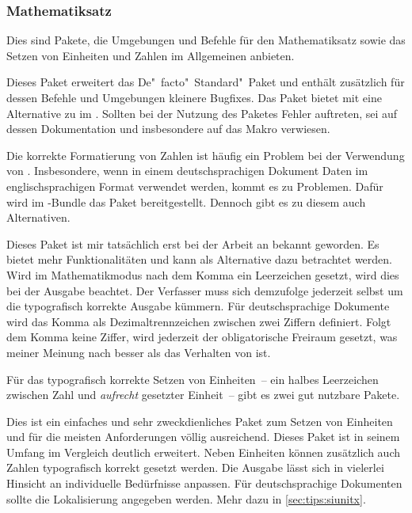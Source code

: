 \subsubsection{%
  Mathematiksatz%
}

Dies sind Pakete, die Umgebungen und Befehle für den Mathematiksatz sowie das 
Setzen von Einheiten und Zahlen im Allgemeinen anbieten.

\begin{DeclarePackages}
  Dieses Paket erweitert das De"~facto"~Standard"~Paket  und 
  enthält zusätzlich für dessen Befehle und Umgebungen kleinere Bugfixes.
  Das Paket bietet mit  eine Alternative zu  im 
  . Sollten bei 
  der Nutzung des Paketes Fehler auftreten, sei auf dessen Dokumentation und 
  insbesondere auf das Makro  verwiesen.
\end{DeclarePackages}

Die korrekte Formatierung von Zahlen ist häufig ein Problem bei der Verwendung 
von . Insbesondere, wenn in einem deutschsprachigen Dokument 
Daten im englischsprachigen Format verwendet werden, kommt es zu Problemen. 
Dafür wird im \TUDScript-Bundle das Paket  bereitgestellt. 
Dennoch gibt es zu diesem auch Alternativen.

\begin{DeclarePackages}[Zifferngruppierung]
  Dieses Paket ist mir tatsächlich erst bei der Arbeit an  
  bekannt geworden. Es bietet mehr Funktionalitäten und kann als Alternative 
  dazu betrachtet werden.
  Wird im Mathematikmodus nach dem Komma ein Leerzeichen gesetzt, wird dies 
  bei der Ausgabe beachtet. Der Verfasser muss sich demzufolge jederzeit 
  selbst um die typografisch korrekte Ausgabe kümmern.
  Für deutschsprachige Dokumente wird das Komma als Dezimaltrennzeichen 
  zwischen zwei Ziffern definiert. Folgt dem Komma keine Ziffer, wird 
  jederzeit der obligatorische Freiraum gesetzt, was meiner Meinung nach 
  besser als das Verhalten von  ist.
\end{DeclarePackages}

Für das typografisch korrekte Setzen von Einheiten~-- ein halbes Leerzeichen 
zwischen Zahl und \emph{aufrecht} gesetzter Einheit~-- gibt es zwei gut 
nutzbare Pakete.

\begin{DeclarePackages}[Einheiten]
  Dies ist ein einfaches und sehr zweckdienliches Paket zum Setzen von 
  Einheiten und für die meisten Anforderungen völlig ausreichend.
  Dieses Paket ist in seinem Umfang im Vergleich deutlich erweitert. Neben 
  Einheiten können zusätzlich auch Zahlen typografisch korrekt gesetzt werden. 
  Die Ausgabe lässt sich in vielerlei Hinsicht an individuelle Bedürfnisse 
  anpassen. Für deutschsprachige Dokumenten sollte die Lokalisierung angegeben 
  werden. Mehr dazu in \autoref{sec:tips:siunitx}.
\end{DeclarePackages}

